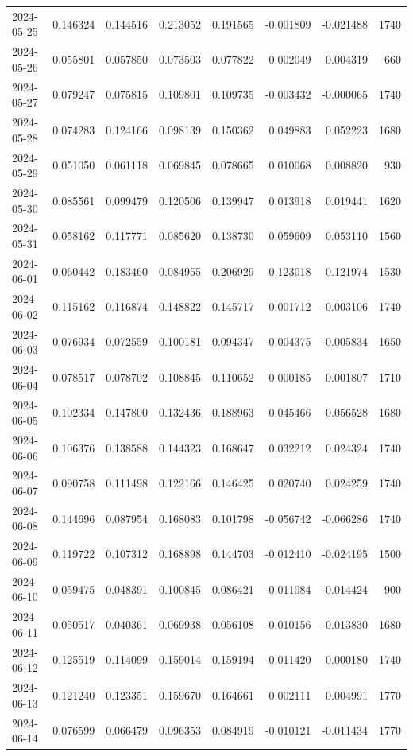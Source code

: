 \begin{tabular}{lrrrrrrr}
2024-05-25 & 0.146324 & 0.144516 & 0.213052 & 0.191565 & -0.001809 & -0.021488 & 1740 \\
2024-05-26 & 0.055801 & 0.057850 & 0.073503 & 0.077822 & 0.002049 & 0.004319 & 660 \\
2024-05-27 & 0.079247 & 0.075815 & 0.109801 & 0.109735 & -0.003432 & -0.000065 & 1740 \\
2024-05-28 & 0.074283 & 0.124166 & 0.098139 & 0.150362 & 0.049883 & 0.052223 & 1680 \\
2024-05-29 & 0.051050 & 0.061118 & 0.069845 & 0.078665 & 0.010068 & 0.008820 & 930 \\
2024-05-30 & 0.085561 & 0.099479 & 0.120506 & 0.139947 & 0.013918 & 0.019441 & 1620 \\
2024-05-31 & 0.058162 & 0.117771 & 0.085620 & 0.138730 & 0.059609 & 0.053110 & 1560 \\
2024-06-01 & 0.060442 & 0.183460 & 0.084955 & 0.206929 & 0.123018 & 0.121974 & 1530 \\
2024-06-02 & 0.115162 & 0.116874 & 0.148822 & 0.145717 & 0.001712 & -0.003106 & 1740 \\
2024-06-03 & 0.076934 & 0.072559 & 0.100181 & 0.094347 & -0.004375 & -0.005834 & 1650 \\
2024-06-04 & 0.078517 & 0.078702 & 0.108845 & 0.110652 & 0.000185 & 0.001807 & 1710 \\
2024-06-05 & 0.102334 & 0.147800 & 0.132436 & 0.188963 & 0.045466 & 0.056528 & 1680 \\
2024-06-06 & 0.106376 & 0.138588 & 0.144323 & 0.168647 & 0.032212 & 0.024324 & 1740 \\
2024-06-07 & 0.090758 & 0.111498 & 0.122166 & 0.146425 & 0.020740 & 0.024259 & 1740 \\
2024-06-08 & 0.144696 & 0.087954 & 0.168083 & 0.101798 & -0.056742 & -0.066286 & 1740 \\
2024-06-09 & 0.119722 & 0.107312 & 0.168898 & 0.144703 & -0.012410 & -0.024195 & 1500 \\
2024-06-10 & 0.059475 & 0.048391 & 0.100845 & 0.086421 & -0.011084 & -0.014424 & 900 \\
2024-06-11 & 0.050517 & 0.040361 & 0.069938 & 0.056108 & -0.010156 & -0.013830 & 1680 \\
2024-06-12 & 0.125519 & 0.114099 & 0.159014 & 0.159194 & -0.011420 & 0.000180 & 1740 \\
2024-06-13 & 0.121240 & 0.123351 & 0.159670 & 0.164661 & 0.002111 & 0.004991 & 1770 \\
2024-06-14 & 0.076599 & 0.066479 & 0.096353 & 0.084919 & -0.010121 & -0.011434 & 1770 \\

\end{tabular}
